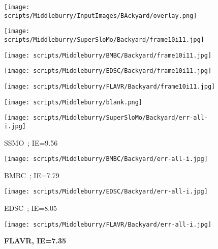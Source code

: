 \documentclass[10pt,twocolumn,letterpaper]{article}
\begin{document}
\begin{figure*}[t]
\begin{center}
    \vspace{1em}
    \begin{subfigure}[b]{0.18\textwidth}
        \centering
        \texttt{[image: scripts/Middleburry/InputImages/BAckyard/overlay.png]}
    \end{subfigure}
    \hfill
    \begin{subfigure}[b]{0.18\textwidth}
        \centering
        \texttt{[image: scripts/Middleburry/SuperSloMo/Backyard/frame10i11.jpg]}
    \end{subfigure}
    \hfill
    \begin{subfigure}[b]{0.18\textwidth}
        \centering
        \texttt{[image: scripts/Middleburry/BMBC/Backyard/frame10i11.jpg]}
    \end{subfigure}
    \hfill
    \begin{subfigure}[b]{0.18\textwidth}
        \centering
        \texttt{[image: scripts/Middleburry/EDSC/Backyard/frame10i11.jpg]}
    \end{subfigure}
    \hfill
    \begin{subfigure}[b]{0.18\textwidth}
        \centering
        \texttt{[image: scripts/Middleburry/FLAVR/Backyard/frame10i11.jpg]}
    \end{subfigure}


     \begin{subfigure}[b]{0.18\textwidth}
        \centering
        \texttt{[image: scripts/Middleburry/blank.png]}
    \end{subfigure}
    \hfill
    \begin{subfigure}[b]{0.18\textwidth}
        \centering
        \texttt{[image: scripts/Middleburry/SuperSloMo/Backyard/err-all-i.jpg]}
        \caption*{SSMO~\cite{jiang2018super}; IE=9.56}
    \end{subfigure}
    \hfill
    \begin{subfigure}[b]{0.18\textwidth}
        \centering
        \texttt{[image: scripts/Middleburry/BMBC/Backyard/err-all-i.jpg]}
        \caption*{BMBC~\cite{park2020bmbc}; IE=7.79}
    \end{subfigure}
    \hfill
    \begin{subfigure}[b]{0.18\textwidth}
        \centering
        \texttt{[image: scripts/Middleburry/EDSC/Backyard/err-all-i.jpg]}
        \caption*{EDSC~\cite{cheng2020multiple}; IE=8.05}
    \end{subfigure}
    \hfill
    \begin{subfigure}[b]{0.18\textwidth}
        \centering
        \texttt{[image: scripts/Middleburry/FLAVR/Backyard/err-all-i.jpg]}
        \caption*{\textbf{FLAVR, IE=7.35}}
    \end{subfigure}
    

\end{center}
\end{figure*}
\end{document}
